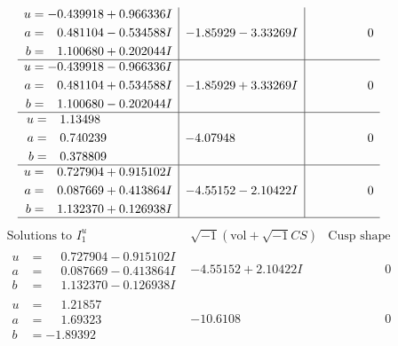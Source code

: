 \documentclass[1p]{elsarticle_modified}
\theoremstyle{definition}
\newcommand{\I}{\sqrt{-1}}
\begin{document}
$$\begin{array}{c|c|c}
\begin{aligned}
u &= -0.439918 + 0.966336 I \\
a &= \phantom{-}0.481104 - 0.534588 I \\
b &= \phantom{-}1.100680 + 0.202044 I\end{aligned}
 & -1.85929 - 3.33269 I & \phantom{-0.000000 } 0 \\ \hline\begin{aligned}
u &= -0.439918 - 0.966336 I \\
a &= \phantom{-}0.481104 + 0.534588 I \\
b &= \phantom{-}1.100680 - 0.202044 I\end{aligned}
 & -1.85929 + 3.33269 I & \phantom{-0.000000 } 0 \\ \hline\begin{aligned}
u &= \phantom{-}1.13498\phantom{ +0.000000I} \\
a &= \phantom{-}0.740239\phantom{ +0.000000I} \\
b &= \phantom{-}0.378809\phantom{ +0.000000I}\end{aligned}
 & -4.07948\phantom{ +0.000000I} & \phantom{-0.000000 } 0 \\ \hline\begin{aligned}
u &= \phantom{-}0.727904 + 0.915102 I \\
a &= \phantom{-}0.087669 + 0.413864 I \\
b &= \phantom{-}1.132370 + 0.126938 I\end{aligned}
 & -4.55152 - 2.10422 I & \phantom{-0.000000 } 0\\
 \hline 
 \end{array}$$\newpage$$\begin{array}{c|c|c}  
\text{Solutions to }I^u_{1}& \I (\text{vol} + \sqrt{-1}CS) & \text{Cusp shape}\\
 \hline 
\begin{aligned}
u &= \phantom{-}0.727904 - 0.915102 I \\
a &= \phantom{-}0.087669 - 0.413864 I \\
b &= \phantom{-}1.132370 - 0.126938 I\end{aligned}
 & -4.55152 + 2.10422 I & \phantom{-0.000000 } 0 \\ \hline\begin{aligned}
u &= \phantom{-}1.21857\phantom{ +0.000000I} \\
a &= \phantom{-}1.69323\phantom{ +0.000000I} \\
b &= -1.89392\phantom{ +0.000000I}\end{aligned}
 & -10.6108\phantom{ +0.000000I} & \phantom{-0.000000 } 0 \\ \hline\begin{aligned}

\end{aligned}
\end{array}$$
\end{document}
